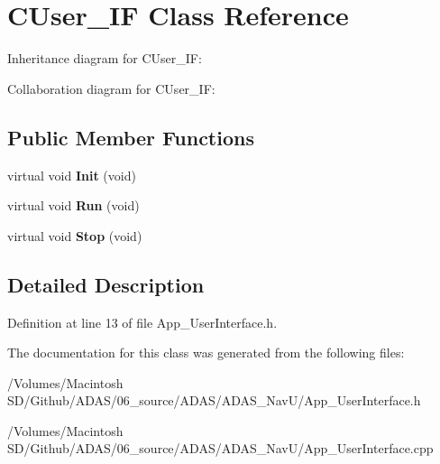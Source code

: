 \hypertarget{class_c_user___i_f}{}\section{C\+User\+\_\+\+IF Class Reference}
\label{class_c_user___i_f}


Inheritance diagram for C\+User\+\_\+\+IF\+:


Collaboration diagram for C\+User\+\_\+\+IF\+:
\subsection*{Public Member Functions}
\begin{DoxyCompactItemize}
\item 
\mbox{\label{class_c_user___i_f_a02c8bba754c77583dc5afaa6877dc547}} 
virtual void {\bfseries Init} (void)
\item 
\mbox{\label{class_c_user___i_f_a1be2e11cd5df5ad0fa5a74a0eb283ec5}} 
virtual void {\bfseries Run} (void)
\item 
\mbox{\label{class_c_user___i_f_ae241b3296f4dd7810897ed8631ede880}} 
virtual void {\bfseries Stop} (void)
\end{DoxyCompactItemize}


\subsection{Detailed Description}


Definition at line 13 of file App\+\_\+\+User\+Interface.\+h.



The documentation for this class was generated from the following files\+:\begin{DoxyCompactItemize}
\item 
/\+Volumes/\+Macintosh S\+D/\+Github/\+A\+D\+A\+S/06\+\_\+source/\+A\+D\+A\+S/\+A\+D\+A\+S\+\_\+\+Nav\+U/App\+\_\+\+User\+Interface.\+h\item 
/\+Volumes/\+Macintosh S\+D/\+Github/\+A\+D\+A\+S/06\+\_\+source/\+A\+D\+A\+S/\+A\+D\+A\+S\+\_\+\+Nav\+U/App\+\_\+\+User\+Interface.\+cpp\end{DoxyCompactItemize}

